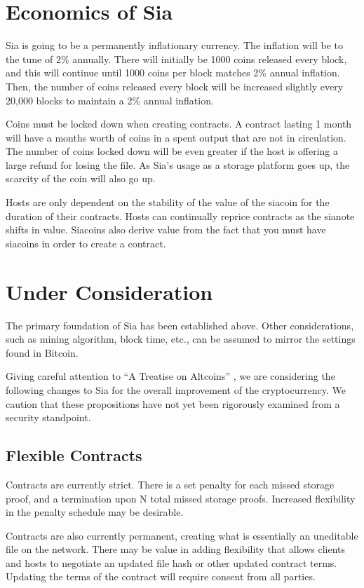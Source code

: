 \documentclass[twocolumn]{article}
\begin{document}
\section{Economics of Sia}
Sia is going to be a permanently inflationary currency.
The inflation will be to the tune of 2\% annually.
There will initially be 1000 coins released every block, and this will continue until 1000 coins per block matches 2\% annual inflation.
Then, the number of coins released every block will be increased slightly every 20,000 blocks to maintain a 2\% annual inflation.

Coins must be locked down when creating contracts.
A contract lasting 1 month will have a months worth of coins in a spent output that are not in circulation.
The number of coins locked down will be even greater if the host is offering a large refund for losing the file.
As Sia's usage as a storage platform goes up, the scarcity of the coin will also go up.

Hosts are only dependent on the stability of the value of the siacoin for the duration of their contracts.
Hosts can continually reprice contracts as the sianote shifts in value.
Siacoins also derive value from the fact that you must have siacoins in order to create a contract.

\section{Under Consideration}
The primary foundation of Sia has been established above.
Other considerations, such as mining algorithm, block time, etc., can be assumed to mirror the settings found in Bitcoin.

Giving careful attention to ``A Treatise on Altcoins'' \cite{alts}, we are considering the following changes to Sia for the overall improvement of the cryptocurrency.
We caution that these propositions have not yet been rigorously examined from a security standpoint.

\subsection{Flexible Contracts}
Contracts are currently strict.
There is a set penalty for each missed storage proof, and a termination upon N total missed storage proofs.
Increased flexibility in the penalty schedule may be desirable.

Contracts are also currently permanent, creating what is essentially an uneditable file on the network.
There may be value in adding flexibility that allows clients and hosts to negotiate an updated file hash or other updated contract terms.
Updating the terms of the contract will require consent from all parties.
\end{document}
